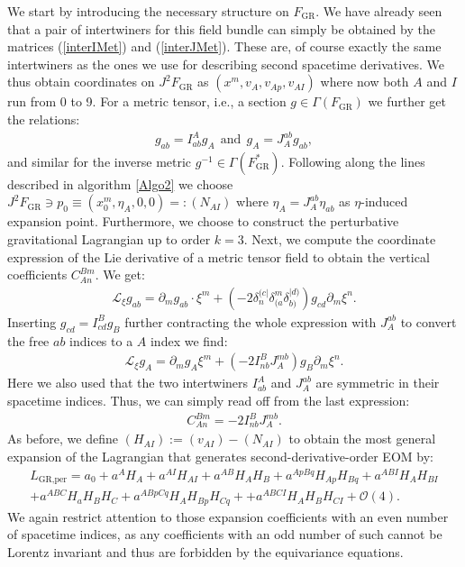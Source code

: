 We start by introducing the necessary structure on $F_{\text{GR}}$. We have already seen that a pair of intertwiners for this field bundle can simply be obtained by the matrices  (\ref{interIMet}) and (\ref{interJMet}). These are, of course exactly the same intertwiners as the ones we use for describing second spacetime derivatives. We thus obtain coordinates on $J^2F_{\text{GR}}$ as $(x^m,v_A,v_{Ap},v_{AI})$ where now both $A$ and $I$ run from 0 to 9. For a metric tensor, i.e., a section $g \in \Gamma(F_{\text{GR}})$ we further get the relations:
\begin{align}
    g_{ab} = I^A _{ab} g_A \ \ \text{and} \ \ g_A = J^{ab}_{A} g_{ab},
\end{align}
and similar for the inverse metric $g^{-1} \in \Gamma(F_{\text{GR}}^{\ast})$.
Following along the lines described in algorithm \ref{Algo2} we choose $J^2F_{\text{GR}} \ni p_0 \equiv (x_0^m,\eta_A,0,0) =: (N_{AI})$ where $\eta_A = J^{ab}_A \eta_{ab}$ as $\eta$-induced expansion point. Furthermore, we choose to construct the perturbative gravitational Lagrangian up to order $k=3$. 
Next, we compute the coordinate expression of the Lie derivative of a metric tensor field to obtain the vertical coefficients $C_{An}^{Bm}$. We get:
\begin{align}
    \mathcal{L}_{\xi} g_{ab} = \partial_m g_{ab} \cdot \xi^m + \left (-2 \delta_n^{(c\vert} \delta_{(a}^m \delta_{b)}^{\vert d)} \right ) g_{cd} \partial_m \xi^n.
\end{align}
Inserting $g_{cd} = I^B_{cd} g_B$ further contracting the whole expression with $J^{ab}_A$ to convert the free $ab$ indices to a $A$ index we find:
\begin{align}
    \mathcal{L}_{\xi} g_A = \partial_m g_A \xi^m + \left (-2 I^B_{nb}J^{mb}_{A} \right )g_B \partial_m \xi ^n. 
\end{align}
Here we also used that the two intertwiners $I^A_{ab}$ and $J_A^{ab}$ are symmetric in their spacetime indices. Thus, we can simply read off from the last expression:
\begin{align}
    C_{An}^{Bm} = -2 I^B_{nb}J_A^{mb}.
\end{align}
As before, we define $(H_{AI}) := (v_{AI}) - (N_{AI})$ to obtain the most general expansion of the Lagrangian that generates second-derivative-order EOM by:
\begin{align}\label{LGR}
    L_{\text{GR,per}} =  a_0 + a^A H_A + a^{AI}H_{AI} + a^{AB} H_{A}H_{B} + a^{ApBq} H_{Ap}H_{Bq} + a^{ABI} H_{A} H_{BI} \\
    + a^{ABC} H_a H_B H_C + a^{ABpCq} H_{A}H_{Bp}H_{Cq} +
    + a^{ABCI} H_A H_B H_{CI} 
    + \mathcal{O}(4).
\end{align}
We again restrict attention to those expansion coefficients with an even number of spacetime indices, as any coefficients with an odd number of such cannot be Lorentz invariant and thus are forbidden by the equivariance equations.

